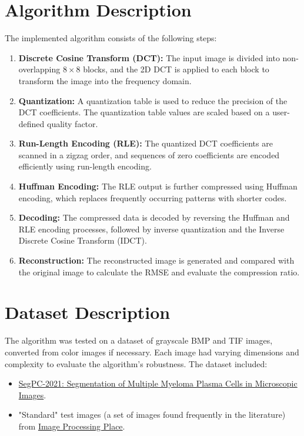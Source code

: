 \documentclass{article}
\begin{document}
\section{Algorithm Description}
The implemented algorithm consists of the following steps:
\begin{enumerate}
    \item \textbf{Discrete Cosine Transform (DCT):} 
    The input image is divided into non-overlapping $8 \times 8$ blocks, and the 2D DCT is applied to each block to transform the image into the frequency domain.
    
    \item \textbf{Quantization:}
    A quantization table is used to reduce the precision of the DCT coefficients. The quantization table values are scaled based on a user-defined quality factor.
    
    \item \textbf{Run-Length Encoding (RLE):}
    The quantized DCT coefficients are scanned in a zigzag order, and sequences of zero coefficients are encoded efficiently using run-length encoding.
    
    \item \textbf{Huffman Encoding:}
    The RLE output is further compressed using Huffman encoding, which replaces frequently occurring patterns with shorter codes.
    
    \item \textbf{Decoding:}
    The compressed data is decoded by reversing the Huffman and RLE encoding processes, followed by inverse quantization and the Inverse Discrete Cosine Transform (IDCT).
    
    \item \textbf{Reconstruction:}
    The reconstructed image is generated and compared with the original image to calculate the RMSE and evaluate the compression ratio.
\end{enumerate}

\section{Dataset Description}
The algorithm was tested on a dataset of grayscale BMP and TIF images, converted from color images if necessary. Each image had varying dimensions and complexity to evaluate the algorithm's robustness. The dataset included:
\begin{itemize}
    \item \href{https://www.kaggle.com/datasets/sbilab/segpc2021dataset}{SegPC-2021: Segmentation of Multiple Myeloma Plasma Cells in Microscopic Images}.
    \item "Standard" test images (a set of images found frequently in the literature) from \href{https://www.imageprocessingplace.com/root_files_V3/image_databases.htm}{Image Processing Place}.
\end{itemize}
\end{document}
